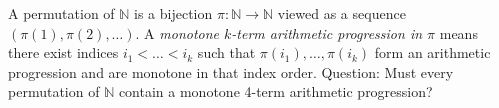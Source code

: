 A permutation of $\mathbb{N}$ is a bijection $\pi:\mathbb{N}\to\mathbb{N}$ viewed as a sequence $(\pi(1),\pi(2),\dots)$.
A \emph{monotone $k$-term arithmetic progression in $\pi$} means there exist indices $i_1<\dots<i_k$ such that
$\pi(i_1),\dots,\pi(i_k)$ form an arithmetic progression and are monotone in that index order.
Question: Must every permutation of $\mathbb{N}$ contain a monotone 4-term arithmetic progression?

